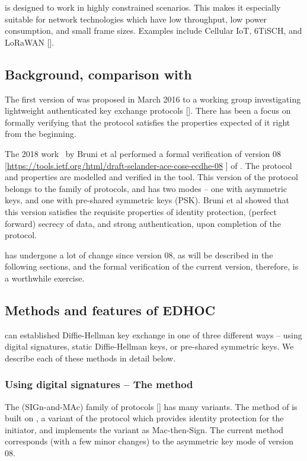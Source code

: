 \mEdhoc is designed to work in highly constrained scenarios. This makes it especially suitable for network technologies which have low throughput, low power consumption, and small frame sizes. Examples include Cellular IoT, 6TiSCH, and LoRaWAN [\mcneed].

\subsection{Background, comparison with~\cite{DBLP:conf/secsr/BruniJPS18}}
The first version of \mEdhoc was proposed in March 2016 to a working group investigating lightweight authenticated key exchange protocols [\mcneed]. There has been a focus on formally verifying that the protocol satisfies the properties expected of it right from the beginning. 

The 2018 work~\cite{DBLP:conf/secsr/BruniJPS18} by Bruni et al performed a formal verification of version 08 [\url{https://tools.ietf.org/html/draft-selander-ace-cose-ecdhe-08} \mcfix] of \mEdhoc. The protocol and properties are modelled and verified in the \mProverif tool. This version of the protocol belongs to the \mSigmaI family of protocols, and has two modes -- one with asymmetric keys, and one with pre-shared symmetric keys (PSK). Bruni et al showed that this version satisfies the requisite properties of identity protection, (perfect forward) secrecy of data, and strong authentication, upon completion of the protocol.

\mEdhoc has undergone a lot of change since version 08, as will be described in the following sections, and the formal verification of the current version, therefore, is a worthwhile exercise.

\subsection{Methods and features of \textsc{EDHOC}}
\mEdhoc can established Diffie-Hellman key exchange in one of three different ways -- using digital signatures, static Diffie-Hellman keys, or pre-shared symmetric keys. We describe each of these methods in detail below.

\subsubsection{Using digital signatures -- The \mSigSig method}
The \mSigma (SIGn-and-MAc) family of protocols [\mcneed] has many variants. The \mSigSig method of \mEdhoc is built on \mSigmaI, a variant of the \mSigma protocol which provides identity protection for the initiator, and  implements the \mSigmaI variant as Mac-then-Sign. The current \mSigSig method corresponds (with a few minor changes) to the asymmetric key mode of \mEdhoc version 08. 

